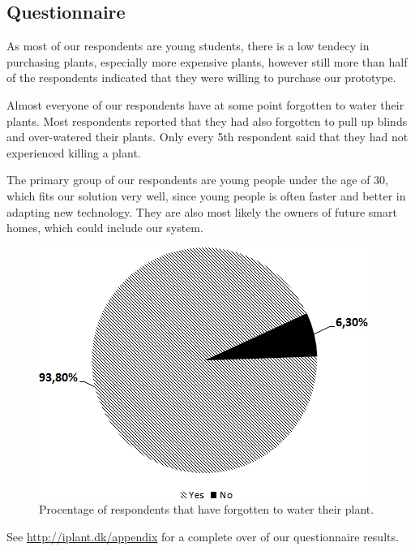 \documentclass{ubicomp2012}
\begin{document}

\subsection{Questionnaire}
As most of our respondents are young students, there is a low tendecy in purchasing plants, especially more expensive plants, however still more than half of the respondents indicated that they were willing to purchase our prototype.

Almost everyone of our respondents have at some point forgotten to water their plants. Most respondents reported that they had also forgotten to pull up blinds and over-watered their plants. Only every 5th respondent said that they had not experienced killing a plant.

The primary group of our respondents are young people under the age of 30, which fits our solution very well, since young people is often faster and better in adapting new technology. They are also most likely the owners of future smart homes, which could include our system.

\begin{figure}[h!]
\centering
\includegraphics[width=\columnwidth]{diagram_forgotten.jpg}
\caption{Procentage of respondents that have forgotten to water their plant.}
\label{fig:Questionnaire}
\end{figure}

See \url{http://iplant.dk/appendix} for a complete over of our questionnaire results.
\end{document}
